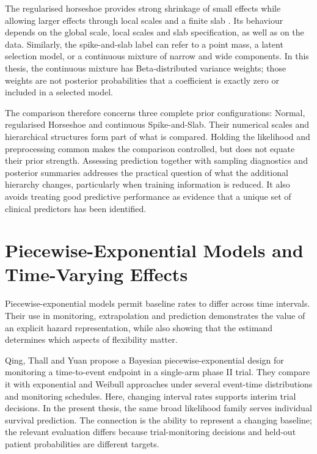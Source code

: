 The regularised horseshoe provides strong shrinkage of small effects while allowing larger effects through local scales and a finite slab \cite{piironen2017}. Its behaviour depends on the global scale, local scales and slab specification, as well as on the data. Similarly, the spike-and-slab label can refer to a point mass, a latent selection model, or a continuous mixture of narrow and wide components. In this thesis, the continuous mixture has Beta-distributed variance weights; those weights are not posterior probabilities that a coefficient is exactly zero or included in a selected model.

The comparison therefore concerns three complete prior configurations: Normal, regularised Horseshoe and continuous Spike-and-Slab. Their numerical scales and hierarchical structures form part of what is compared. Holding the likelihood and preprocessing common makes the comparison controlled, but does not equate their prior strength. Assessing prediction together with sampling diagnostics and posterior summaries addresses the practical question of what the additional hierarchy changes, particularly when training information is reduced. It also avoids treating good predictive performance as evidence that a unique set of clinical predictors has been identified.

\section{Piecewise-Exponential Models and Time-Varying Effects}\label{piecewise-exponential-models-and-time-varying-effects}

Piecewise-exponential models permit baseline rates to differ across time intervals. Their use in monitoring, extrapolation and prediction demonstrates the value of an explicit hazard representation, while also showing that the estimand determines which aspects of flexibility matter.

Qing, Thall and Yuan \cite{ref38} propose a Bayesian piecewise-exponential design for monitoring a time-to-event endpoint in a single-arm phase II trial. They compare it with exponential and Weibull approaches under several event-time distributions and monitoring schedules. Here, changing interval rates supports interim trial decisions. In the present thesis, the same broad likelihood family serves individual survival prediction. The connection is the ability to represent a changing baseline; the relevant evaluation differs because trial-monitoring decisions and held-out patient probabilities are different targets.

